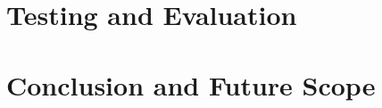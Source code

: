 \documentclass[a4paper, 12pt]{report}
\begin{document}
\chapter{Testing and Evaluation}


\chapter{Conclusion and Future Scope}


\newpage
{}
{}
\printbibliography

\newpage
\appendix

\end{document}
